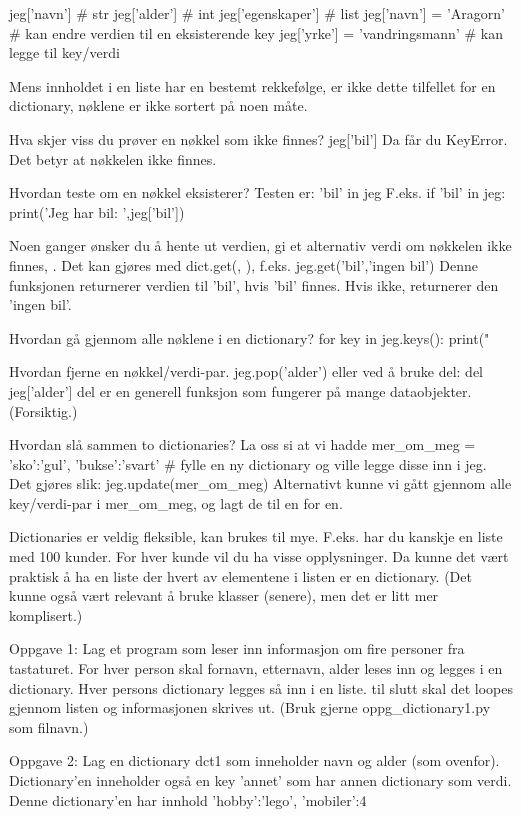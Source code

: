 jeg['navn']         # str
jeg['alder']        # int
jeg['egenskaper']   # list
jeg['navn'] = 'Aragorn'        # kan endre verdien til en eksisterende key
jeg['yrke'] = 'vandringsmann'  # kan legge til key/verdi 


Mens innholdet i en liste har en bestemt rekkefølge, er ikke dette tilfellet 
for en dictionary, nøklene er ikke sortert på noen måte.

Hva skjer viss du prøver en nøkkel som ikke finnes?
jeg['bil']
Da får du KeyError. Det betyr at nøkkelen ikke finnes.

Hvordan teste om en nøkkel eksisterer?
Testen er: 'bil' in jeg
F.eks.
if 'bil' in jeg:
   print('Jeg har bil: ',jeg['bil'])

Noen ganger ønsker du å hente ut verdien, gi et alternativ verdi om nøkkelen ikke finnes, 
.
Det kan gjøres med dict.get(, ), f.eks. 
jeg.get('bil','ingen bil')
Denne funksjonen returnerer verdien til 'bil', hvis 'bil' finnes. 
Hvis ikke, returnerer den 'ingen bil'.


Hvordan gå gjennom alle nøklene i en dictionary?
for key in jeg.keys():
   print("  %


Hvordan fjerne en nøkkel/verdi-par. 
jeg.pop('alder')
eller ved å bruke del: 
del jeg['alder']
del er en generell funksjon som fungerer på mange dataobjekter. (Forsiktig.) 


Hvordan slå sammen to dictionaries?
La oss si at vi hadde 
mer_om_meg = {'sko':'gul', 'bukse':'svart'}   # fylle en ny dictionary
og ville legge disse inn i jeg.
Det gjøres slik:
jeg.update(mer_om_meg)
Alternativt kunne vi gått gjennom alle key/verdi-par i mer_om_meg, 
og lagt de til en for en.

Dictionaries er veldig fleksible, kan brukes til mye.
F.eks. har du kanskje en liste med 100 kunder.
For hver kunde vil du ha visse opplysninger.
Da kunne det vært praktisk å ha en liste der hvert av elementene i listen er en dictionary.
(Det kunne også vært relevant å bruke klasser (senere), men det er litt mer komplisert.) 



Oppgave 1: Lag et program som leser inn informasjon om fire personer fra tastaturet.
For hver person skal fornavn, etternavn, alder leses inn og legges i en dictionary.
Hver persons dictionary legges så inn i en liste.
til slutt skal det loopes gjennom listen og informasjonen skrives ut. 
(Bruk gjerne oppg_dictionary1.py som filnavn.) 


Oppgave 2: Lag en dictionary dct1 som inneholder navn og alder (som ovenfor).
Dictionary'en inneholder også en key 'annet' som har annen dictionary som verdi.
Denne dictionary'en har innhold {'hobby':'lego', 'mobiler':4}

